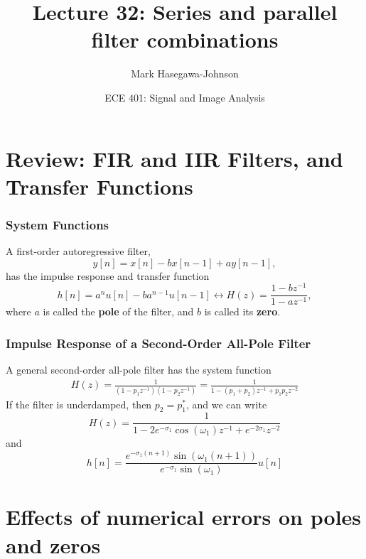 \documentclass{beamer}
\title{Lecture 32: Series and parallel filter combinations}
\author{Mark Hasegawa-Johnson}
\date{ECE 401: Signal and Image Analysis}
\begin{document}
\begin{frame}
  \maketitle
\end{frame}

\begin{frame}
  \tableofcontents
\end{frame}

\section[Review]{Review: FIR and IIR Filters, and Transfer Functions}
\setcounter{subsection}{1}

\begin{frame}
  \frametitle{System Functions}
  A first-order autoregressive filter,
  \[
  y[n] = x[n]-bx[n-1]+ay[n-1],
  \]
  has the impulse response and transfer function
  \[
  h[n]=a^n u[n]-ba^{n-1}u[n-1] \leftrightarrow H(z)  = \frac{1-bz^{-1}}{1-az^{-1}},
  \]
  where $a$ is called the {\bf pole} of the filter, and $b$ is called
  its {\bf zero}.
\end{frame}

\begin{frame}
  \frametitle{Impulse Response of a Second-Order All-Pole Filter}

  A general second-order all-pole filter has the system function
  \begin{align*}
    H(z) = \frac{1}{(1-p_1z^{-1})(1-p_2z^{-1})}= \frac{1}{1-(p_1+p_2)z^{-1}+p_1p_2z^{-2}}
  \end{align*}
  If the filter is underdamped, then $p_2=p_1^*$, and we can write
  \[
  H(z) = \frac{1}{1-2e^{-\sigma_1}\cos(\omega_1)z^{-1}+ e^{-2\sigma_1}z^{-2}}
  \]
  and
  \[
  h[n] = \frac{e^{-\sigma_1(n+1)}\sin(\omega_1(n+1))}{e^{-\sigma_1}\sin(\omega_1)} u[n]
  \]
\end{frame}

\section[Errors]{Effects of numerical errors on poles and zeros}
\end{document}

